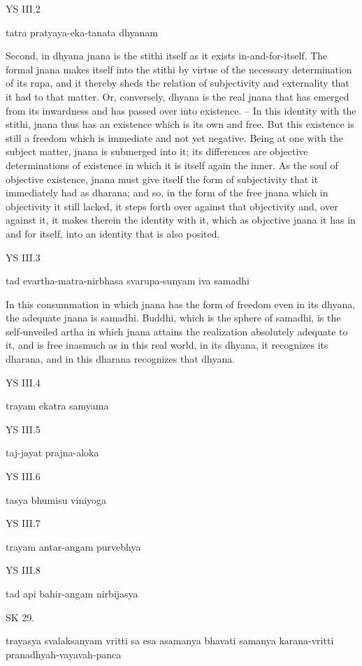 YS III.2

tatra pratyaya-eka-tanata dhyanam

Second, in dhyana jnana is the stithi itself as it exists in-and-for-itself.
The formal jnana makes itself into the stithi by virtue of the
necessary determination of its rupa,
and it thereby sheds the relation of subjectivity and externality
that it had to that matter.
Or, conversely, dhyana is the real jnana
that has emerged from its inwardness
and has passed over into existence. –
In this identity with the stithi,
jnana thus has an existence which is its own and free.
But this existence is still a freedom which is immediate and not yet negative.
Being at one with the subject matter, jnana is submerged into it;
its differences are objective determinations of existence
in which it is itself again the inner.
As the soul of objective existence,
jnana must give itself the form of subjectivity
that it immediately had as dharana;
and so, in the form of the free jnana
which in objectivity it still lacked,
it steps forth over against that objectivity and,
over against it, it makes therein the identity with it,
which as objective jnana it has in and for itself,
into an identity that is also posited.


YS III.3

tad evartha-matra-nirbhasa svarupa-sunyam iva samadhi

In this consummation in which jnana has
the form of freedom even in its dhyana,
the adequate jnana is samadhi.
Buddhi, which is the sphere of samadhi,
is the self-unveiled artha in which jnana attains
the realization absolutely adequate to it,
and is free inasmuch as in this real world,
in its dhyana, it recognizes its dharana,
and in this dharana recognizes that dhyana.

YS III.4

trayam ekatra samyama

YS III.5

taj-jayat prajna-aloka

YS III.6

tasya bhumisu viniyoga

YS III.7

trayam antar-angam purvebhya

YS III.8

tad api bahir-angam nirbijasya

SK 29.

trayasya svalaksanyam vritti sa esa asamanya bhavati
samanya karana-vritti pranadhyah-vayavah-panca

